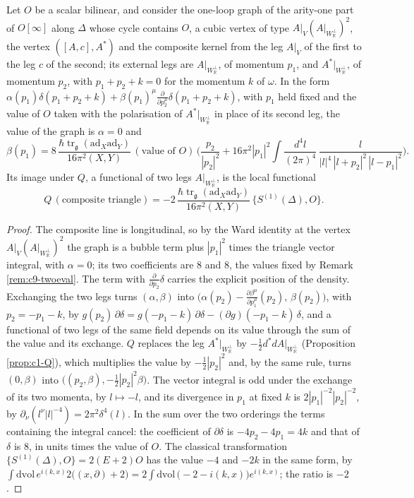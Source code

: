 \begin{proposition}
\label{prop:c9-triangle}
Let $O$ be a scalar bilinear, and consider the one-loop graph of the arity-one part of $O[\infty]$ along $\Delta$ whose cycle contains $O$, a cubic vertex of type $A|_V(A|_{W_{\mathbb R}^\perp})^2$, the vertex $([A,c],A^*)$ and the composite kernel from the leg $A|_V$ of the first to the leg $c$ of the second; its external legs are $A|_{W_{\mathbb R}^\perp}$, of momentum $p_1$, and $A^*|_{W_{\mathbb R}^\perp}$, of momentum $p_2$, with $p_1+p_2+k=0$ for the momentum $k$ of $\omega$. In the form $\alpha(p_1)\delta(p_1+p_2+k)+\beta(p_1)^\mu\frac{\partial}{\partial p_2^\mu}\delta(p_1+p_2+k)$, with $p_1$ held fixed and the value of $O$ taken with the polarisation of $A^*|_{W_{\mathbb R}^\perp}$ in place of its second leg, the value of the graph is $\alpha=0$ and
\[
\beta(p_1)=8\,\frac{\hbar\operatorname{tr}_{\mathfrak g}(\mathrm{ad}_X\mathrm{ad}_Y)}{16\pi^2(X,Y)}\,(\text{value of }O)\,\Big(\frac{p_2}{|p_2|^2}+16\pi^2|p_1|^2\int\frac{d^4l}{(2\pi)^4}\,\frac{l}{|l|^4\,|l+p_2|^2\,|l-p_1|^2}\Big).
\]
Its image under $Q$, a functional of two legs $A|_{W_{\mathbb R}^\perp}$, is the local functional
\begin{equation}
Q\,(\text{composite triangle})=-2\,\frac{\hbar\operatorname{tr}_{\mathfrak g}(\mathrm{ad}_X\mathrm{ad}_Y)}{16\pi^2(X,Y)}\,\{S^{(1)}(\Delta),O\}.
\label{eq:c9-triangle}
\end{equation}
\end{proposition}

\begin{proof}
The composite line is longitudinal, so by the Ward identity at the vertex $A|_V(A|_{W_{\mathbb R}^\perp})^2$ the graph is a bubble term plus $|p_1|^2$ times the triangle vector integral, with $\alpha=0$; its two coefficients are $8$ and $8$, the values fixed by Remark \ref{rem:c9-twoeval}. The term with $\frac{\partial}{\partial p_2}\delta$ carries the explicit position of the density. Exchanging the two legs turns $(\alpha,\beta)$ into $\big(\alpha(p_2)-\tfrac{\partial\beta^\mu}{\partial p_1^\mu}(p_2),\,\beta(p_2)\big)$, with $p_2=-p_1-k$, by $g(p_2)\,\partial\delta=g(-p_1-k)\,\partial\delta-(\partial g)(-p_1-k)\,\delta$, and a functional of two legs of the same field depends on its value through the sum of the value and its exchange. $Q$ replaces the leg $A^*|_{W_{\mathbb R}^\perp}$ by $-\tfrac12d^*dA|_{W_{\mathbb R}^\perp}$ (Proposition \ref{prop:c1-Q}), which multiplies the value by $-\tfrac12|p_2|^2$ and, by the same rule, turns $(0,\beta)$ into $\big((p_2,\beta),-\tfrac12|p_2|^2\beta\big)$. The vector integral is odd under the exchange of its two momenta, by $l\mapsto-l$, and its divergence in $p_1$ at fixed $k$ is $2|p_1|^{-2}|p_2|^{-2}$, by $\partial_\nu(l^\nu|l|^{-4})=2\pi^2\delta^4(l)$. In the sum over the two orderings the terms containing the integral cancel: the coefficient of $\partial\delta$ is $-4p_2-4p_1=4k$ and that of $\delta$ is $8$, in units times the value of $O$. The classical transformation $\{S^{(1)}(\Delta),O\}=2(E+2)O$ has the value $-4$ and $-2k$ in the same form, by $\int\mathrm{dvol}\,e^{i(k,x)}2\big((x,\partial)+2\big)=2\int\mathrm{dvol}\,\big(-2-i(k,x)\big)e^{i(k,x)}$; the ratio is $-2$.
\end{proof}

